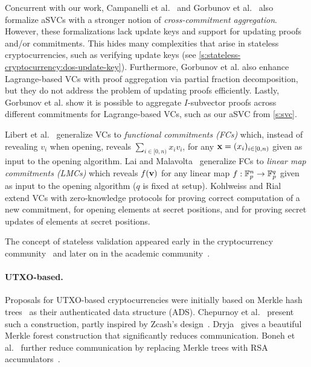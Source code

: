 Concurrent with our work, Campanelli et al.~\cite{CFG+20} and Gorbunov et al.~\cite{GRWZ20} also formalize aSVCs with a stronger notion of \textit{cross-commitment aggregation}.
However, these formalizations lack update keys and support for updating proofs and/or commitments.
This hides many complexities that arise in stateless cryptocurrencies, such as verifying update keys (see \cref{s:stateless-cryptocurrency:dos-update-key}).
Furthermore, Gorbunov et al. also enhance Lagrange-based VCs with proof aggregation via partial fraction decomposition, but they do not address the problem of updating proofs efficiently.
Lastly, Gorbunov et al. show it is possible to aggregate $I$-subvector proofs across different commitments for Lagrange-based VCs, such as our aSVC from \cref{s:svc}.

Libert et al.~\cite{LRY16} generalize VCs to \textit{functional commitments (FCs)} which, instead of revealing $v_i$ when opening, reveals $\sum_{i\in[0,n)} x_i v_i$, for any $\bm{\mathrm{x}}=(x_i)_{i\in[0,n)}$ given as input to the opening algorithm.
Lai and Malavolta~\cite{LM19} generalize FCs to \textit{linear map commitments (LMCs)} which reveals $f(\bm{\mathrm{v}})$ for any linear map $f : \mathbb{F}_p^n \rightarrow \mathbb{F}_p^q$ given as input to the opening algorithm ($q$ is fixed at setup).
Kohlweiss and Rial~\cite{KR13} extend VCs with zero-knowledge protocols for proving correct computation of a new commitment, for opening elements at secret positions, and for proving secret updates of elements at secret positions.

The concept of stateless validation appeared early in the cryptocurrency community~\cite{Miller12,Todd16,Buterin17} and later on in the academic community~\cite{RMCI17,Dryja19,CPZ18,BBF19,GRWZ20}.

\paragraph{UTXO-based.}
Proposals for UTXO-based cryptocurrencies were initially based on Merkle hash trees~\cite{Miller12,Todd16,Dryja19,CPZ18} as their authenticated data structure (ADS).
Chepurnoy et al.~\cite{CPZ18} present such a construction, partly inspired by Zcash's design~\cite{BCG+14}.
Dryja~\cite{Dryja19} gives a beautiful Merkle forest construction that significantly reduces communication.
Boneh et al.~\cite{BBF18,BBF19} further reduce communication by replacing Merkle trees with RSA accumulators~\cite{Bd93,LLX07}.


